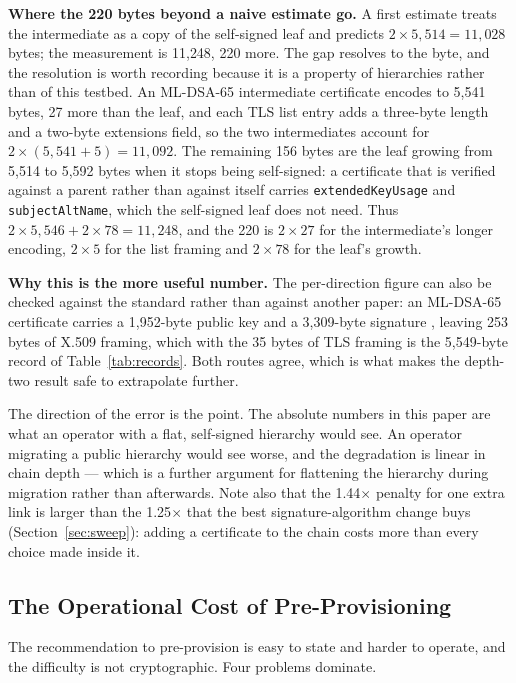 \documentclass[drones,article,submit,pdftex,moreauthors]{Definitions/mdpi}
\newcommand{\mldsa}{ML-DSA}
\newcommand{\tls}{TLS}
\begin{document}
\textbf{Where the 220 bytes beyond a naive estimate go.} A first
estimate treats the intermediate as a copy of the self-signed leaf and
predicts $2\times5{,}514=11{,}028$ bytes; the measurement is 11{,}248,
220 more. The gap resolves to the byte, and the resolution is worth
recording because it is a property of hierarchies rather than of this
testbed. An \mldsa{}-65 intermediate certificate encodes to 5{,}541
bytes, 27 more than the leaf, and each \tls{} list entry adds a
three-byte length and a two-byte extensions field, so the two
intermediates account for $2\times(5{,}541+5)=11{,}092$. The remaining
156 bytes are the leaf growing from 5{,}514 to 5{,}592 bytes when it
stops being self-signed: a certificate that is verified against a parent
rather than against itself carries \texttt{extendedKeyUsage} and
\texttt{subjectAltName}, which the self-signed leaf does not need.
Thus $2\times5{,}546+2\times78=11{,}248$, and the 220 is $2\times27$ for
the intermediate's longer encoding, $2\times5$ for the list framing and
$2\times78$ for the leaf's growth.

\textbf{Why this is the more useful number.} The per-direction
figure can also be checked against the standard rather than against
another paper: an \mldsa{}-65 certificate carries a 1{,}952-byte public
key and a 3{,}309-byte signature \cite{fips204}, leaving 253 bytes of
X.509 framing, which with the 35 bytes of \tls{} framing is the
5{,}549-byte record of Table~\ref{tab:records}.
Both routes agree, which is what makes the depth-two result safe to
extrapolate further.

The direction of the error is the point. The absolute numbers in this
paper are what an operator with a flat, self-signed hierarchy would see.
An operator migrating a public hierarchy would see worse, and the
degradation is linear in chain depth --- which is a further argument for
flattening the hierarchy during migration rather than afterwards. Note
also that the 1.44$\times$ penalty for one extra link is larger than the
1.25$\times$ that the best signature-algorithm change buys
(Section~\ref{sec:sweep}): adding a certificate to the chain costs more
than every choice made inside it.

\subsection{The Operational Cost of Pre-Provisioning}
\label{sec:keymgmt}

The recommendation to pre-provision is easy to state and harder to
operate, and the difficulty is not cryptographic. Four problems
dominate.
\end{document}
